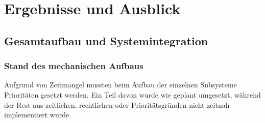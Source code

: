 \cleardoublepage
\fancyfoot[C]{}
\part{Ergebnisse und Ausblick}
\label{part:ergebnisse_und_ausblick}

\chapter{Gesamtaufbau und Systemintegration}
\label{ch:aufbau_albert}




\section{Stand des mechanischen Aufbaus}
\label{sec:mechanical_build_status}
Aufgrund von Zeitmangel mussten beim Aufbau der einzelnen Subsysteme Prioritäten gesetzt werden. Ein Teil davon wurde wie geplant umgesetzt, während der Rest aus zeitlichen, rechtlichen oder Prioritätsgründen nicht zeitnah implementiert wurde.


